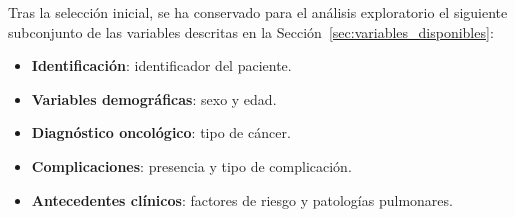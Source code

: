 Tras la selección inicial, se ha conservado para el análisis exploratorio el siguiente subconjunto de las variables descritas en la Sección~\ref{sec:variables_disponibles}:








\begin{itemize}
    \item \textbf{Identificación}: identificador del paciente.
    \item \textbf{Variables demográficas}: sexo y edad.
    \item \textbf{Diagnóstico oncológico}: tipo de cáncer.
    \item \textbf{Complicaciones}: presencia y tipo de complicación.
    \item \textbf{Antecedentes clínicos}: factores de riesgo y patologías pulmonares.
\end{itemize}

